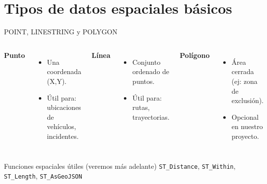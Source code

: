 \documentclass[10pt, aspectratio=169]{beamer}
\begin{document}
\section{Tipos de datos espaciales básicos}
\begin{frame}{POINT, LINESTRING y POLYGON}
    \begin{columns}
        \textbf{Punto}
        \begin{itemize}
            \item Una coordenada (X,Y).
            \item Útil para: ubicaciones de vehículos, incidentes.
        \end{itemize}
        \textbf{Línea}
        \begin{itemize}
            \item Conjunto ordenado de puntos.
            \item Útil para: rutas, trayectorias.
        \end{itemize}
        \textbf{Polígono}
        \begin{itemize}
            \item Área cerrada (ej: zona de exclusión).
            \item Opcional en nuestro proyecto.
        \end{itemize}
    \end{columns}
    \vspace{0.5cm}
    \begin{block}{Funciones espaciales útiles (veremos más adelante)}
        \texttt{ST\_Distance}, \texttt{ST\_Within}, \texttt{ST\_Length}, \texttt{ST\_AsGeoJSON}
    \end{block}
\end{frame}
\end{document}
